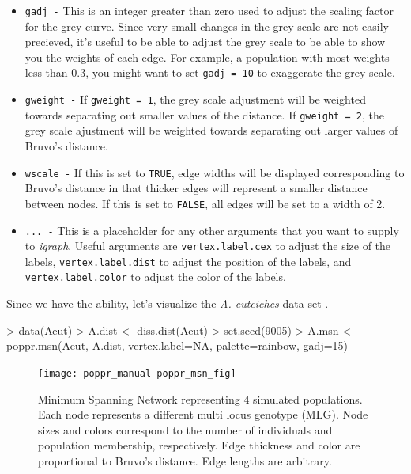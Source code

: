 \documentclass[letterpaper]{article}
\begin{document}
\begin{itemize}
  \item \texttt{gadj -} This is an integer greater than zero used to adjust the scaling factor for the grey curve. Since very small changes in the grey scale are not easily precieved, it's useful to be able to adjust the grey scale to be able to show you the weights of each edge. For example, a population with most weights less than 0.3, you might want to set \texttt{gadj = 10} to exaggerate the grey scale. 
  \item \texttt{gweight -} If \texttt{gweight = 1}, the grey scale adjustment will be weighted towards separating out smaller values of the distance. If \texttt{gweight = 2}, the grey scale ajustment will be weighted towards separating out larger values of Bruvo's distance.
  \item \texttt{wscale -} If this is set to \texttt{TRUE}, edge widths will be displayed corresponding to Bruvo's distance in that thicker edges will represent a smaller distance between nodes. If this is set to \texttt{FALSE}, all edges will be set to a width of 2. 
  \item \texttt{... -} This is a placeholder for any other arguments that you want to supply to \textit{igraph}. Useful arguments are \texttt{vertex.label.cex} to adjust the size of the labels, \texttt{vertex.label.dist} to adjust the position of the labels, and \texttt{vertex.label.color} to adjust the color of the labels.
\end{itemize}

Since we have the ability, let's visualize the \textit{A. euteiches} data set \cite{Grunwald:2006}.
\begin{Schunk}
\begin{Sinput}
> data(Aeut)
> A.dist <- diss.dist(Aeut)
> set.seed(9005)
> A.msn <- poppr.msn(Aeut, A.dist, vertex.label=NA, palette=rainbow, gadj=15)
\end{Sinput}
\end{Schunk}

\begin{figure}[ht!]
  \centering
  \caption{\footnotesize Minimum Spanning Network representing 4 simulated populations. Each node represents a different multi locus genotype (MLG). Node sizes and colors correspond to the number of individuals and population membership, respectively. Edge thickness and color are proportional to Bruvo's distance. Edge lengths are arbitrary.}
  \label{mst_poppr}
\texttt{[image: poppr\_manual-poppr\_msn\_fig]}
\end{figure}
\newpage
\end{document}
